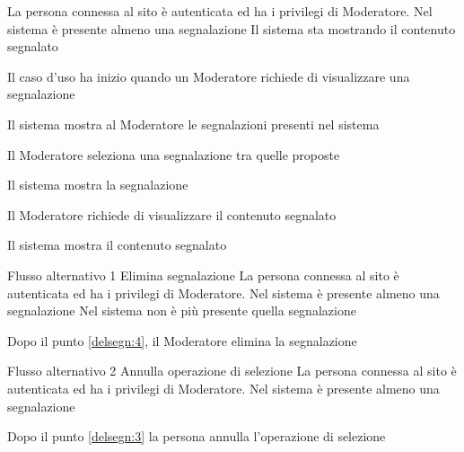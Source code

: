 
{}
{La persona connessa al sito è autenticata  ed ha i privilegi di Moderatore. Nel sistema è presente almeno una segnalazione}
{Il sistema sta mostrando il contenuto segnalato}
{\begin{enumCU}
	\item Il caso d'uso ha inizio quando un Moderatore richiede di visualizzare una segnalazione
	\item Il sistema mostra al Moderatore le segnalazioni presenti nel sistema\label{delsegn:3}
	\item Il Moderatore seleziona una segnalazione tra quelle proposte
	\item Il sistema mostra la segnalazione \label{delsegn:4}
	\item Il Moderatore richiede di visualizzare il \gls{contenuto} segnalato
	\item Il sistema mostra il \gls{contenuto} segnalato
\end{enumCU}
}
%
{Flusso alternativo 1}%
{Elimina segnalazione}%
{La persona connessa al sito è autenticata  ed ha i privilegi di Moderatore. Nel sistema è presente almeno una segnalazione}
{Nel sistema non è più presente quella segnalazione}%
{\begin{enumCU}
		\item Dopo il punto \ref{delsegn:4}, il Moderatore elimina la segnalazione
\end{enumCU}}%
%	
{Flusso alternativo 2}%
{Annulla operazione di selezione}%
{La persona connessa al sito è autenticata ed ha i privilegi di Moderatore. Nel sistema è presente almeno una segnalazione}%
{\postNulle}%
{\begin{enumCU}
		\item Dopo il punto \ref{delsegn:3} la persona annulla l'operazione di selezione
\end{enumCU}}%


